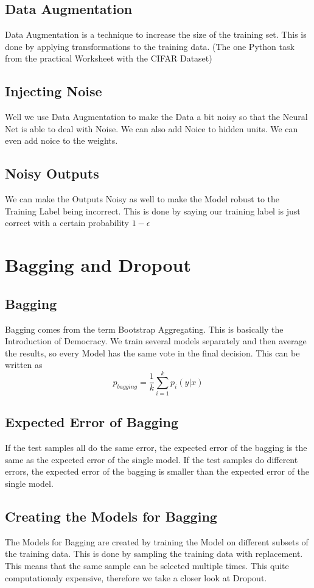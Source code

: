 \documentclass[a4paper]{article}
\begin{document}
\subsection{Data Augmentation}
Data Augmentation is a technique to increase the size of the training set. This is done by applying transformations to the training data. (The one Python task from the practical Worksheet with the CIFAR Dataset)
\subsection{Injecting Noise}
Well we use Data Augmentation to make the Data a bit noisy so that the Neural Net is able to deal with Noise. We can also add Noice to hidden units. 
We can even add noice to the weights. 
\subsection{Noisy Outputs}
We can make the Outputs Noisy as well to make the Model robust to the Training Label being incorrect. This is done by saying our training label is just correct with a certain probability $1 - \epsilon$ 

\section{Bagging and Dropout}
\subsection{Bagging}
Bagging comes from the term Bootstrap Aggregating. This is basically the Introduction of Democracy. We train several models separately and then average the results, so every Model has the same vote in the final decision. This can be written as $$ p_{bagging} = \frac{1}{k} \sum_{i=1}^{k} p_{i}(y|x)$$ 

\subsection{Expected Error of Bagging}
If the test samples all do the same error, the expected error of the bagging is the same as the expected error of the single model. If the test samples do different errors, the expected error of the bagging is smaller than the expected error of the single model. 

\subsection{Creating the Models for Bagging}
The Models for Bagging are created by training the Model on different subsets of the training data. This is done by sampling the training data with replacement. This means that the same sample can be selected multiple times. This quite computationaly expensive, therefore we take a closer look at Dropout.
\end{document}
